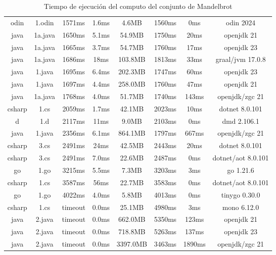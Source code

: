 \begin{table}[]
{\begin{tabular}{|c c c c c c c c|}
            odin    & 1.odin  & 1571ms  & 1.6ms  & 4.6MB    & 1560ms     & 0ms       & odin 2024 \\
            java    & 1a.java & 1650ms  & 5.1ms  & 54.9MB   & 1750ms     & 20ms      & openjdk 21 \\
            java    & 1a.java & 1665ms  & 3.7ms  & 54.7MB   & 1760ms     & 17ms      & openjdk 23 \\
            java    & 1a.java & 1686ms  & 18ms 	 & 103.8MB  & 1813ms     & 33ms      & graal/jvm 17.0.8 \\
            java    & 1.java  & 1695ms  & 6.4ms  & 202.3MB  & 1747ms     & 60ms      & openjdk 23 \\
            java    & 1.java  & 1697ms  & 4.4ms  & 258.0MB  & 1760ms     & 47ms      & openjdk 21 \\
            java    & 1a.java & 1768ms  & 4.0ms  & 51.7MB   & 1740ms     & 143ms     & openjdk/zgc 21 \\
            csharp  & 1.cs    & 2059ms  & 1.7ms  & 42.1MB   & 2023ms     & 10ms      & dotnet 8.0.101 \\
            d       & 1.d     & 2117ms  & 11ms 	 & 9.0MB    & 2103ms     & 0ms       & dmd 2.106.1 \\
            java    & 1.java  & 2356ms  & 6.1ms  & 864.1MB  & 1797ms     & 667ms     & openjdk/zgc 21 \\
            csharp  & 3.cs    & 2491ms  & 24ms 	 & 42.5MB   & 2443ms     & 20ms      & dotnet 8.0.101 \\
            csharp  & 3.cs    & 2491ms  & 7.0ms  & 22.6MB   & 2487ms     & 0ms       & dotnet/aot 8.0.101 \\
            go      & 1.go    & 3215ms  & 5.5ms  & 7.3MB    & 3203ms     & 3ms       & go 1.21.6 \\
            csharp  & 1.cs    & 3587ms  & 56ms 	 & 22.7MB   & 3583ms     & 0ms       & dotnet/aot 8.0.101 \\
            go      & 1.go    & 4022ms  & 4.0ms  & 5.8MB    & 4013ms     & 0ms       & tinygo 0.30.0 \\
            csharp  & 1.cs    & timeout & 0.0ms  & 25.1MB   & 4980ms     & 3ms       & mono 6.12.0 \\
            java    & 2.java  & timeout & 0.0ms  & 662.0MB  & 5350ms     & 123ms     & openjdk 21 \\
            java    & 2.java  & timeout & 0.0ms  & 718.8MB  & 5263ms     & 137ms     & openjdk 23 \\
            java    & 2.java  & timeout & 0.0ms  & 3397.0MB & 3463ms     & 1890ms    & openjdk/zgc 21  \\
            \hline
        \end{tabular}
    }
    \caption{Tiempo de ejecución del computo del conjunto de Mandelbrot \cite{languagebench}}
    \label{table:languagebench}
\end{table}

